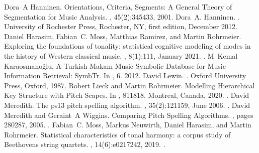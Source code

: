 \documentclass[letterpaper,10pt,english]{sphinxmanual}
\begin{document}
\begin{sphinxthebibliography}{10}
Dora A Hanninen. Orientations, Criteria, Segments: A General Theory of Segmentation for Music Analysis. , 45(2):345\textendash{}433, 2001.
Dora A. Hanninen. . University of Rochester Press, Rochester, NY, first edition, December 2012.
Daniel Harasim, Fabian C. Moss, Matthias Ramirez, and Martin Rohrmeier. Exploring the foundations of tonality: statistical cognitive modeling of modes in the history of Western classical music. , 8(1):1\textendash{}11, January 2021. .
M Kemal Karaosmanoğlu. A Turkish Makam Music Symbolic Database for Music Information Retrieval: SymbTr. In , 6. 2012.
David Lewin. . Oxford University Press, Oxford, 1987.
Robert Lieck and Martin Rohrmeier. Modelling Hierarchical Key Structure with Pitch Scapes. In , 811\textendash{}818. Montreal, Canada, 2020. .
David Meredith. The ps13 pitch spelling algorithm. , 35(2):121\textendash{}159, June 2006. .
David Meredith and Geraint A Wiggins. Comparing Pitch Spelling Algorithms. , pages 280\textendash{}287, 2005. .
Fabian C. Moss, Markus Neuwirth, Daniel Harasim, and Martin Rohrmeier. Statistical characteristics of tonal harmony: a corpus study of Beethoven\textquotesingle{}s string quartets. , 14(6):e0217242, 2019. .

\end{sphinxthebibliography}
\end{document}
